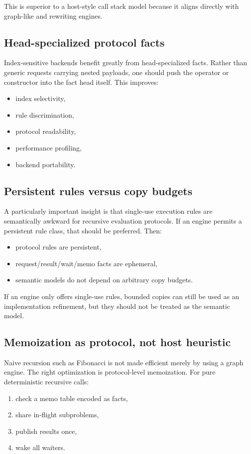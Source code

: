 \documentclass[11pt]{article}
\begin{document}
This is superior to a host-style call stack model because it aligns directly with graph-like and rewriting engines.

\subsection{Head-specialized protocol facts}

Index-sensitive backends benefit greatly from head-specialized facts. Rather than generic requests carrying nested payloads, one should push the operator or constructor into the fact head itself. This improves:
\begin{itemize}[leftmargin=2em]
  \item index selectivity,
  \item rule discrimination,
  \item protocol readability,
  \item performance profiling,
  \item backend portability.
\end{itemize}

\subsection{Persistent rules versus copy budgets}

A particularly important insight is that single-use execution rules are semantically awkward for recursive evaluation protocols. If an engine permits a persistent rule class, that should be preferred. Then:
\begin{itemize}[leftmargin=2em]
  \item protocol rules are persistent,
  \item request/result/wait/memo facts are ephemeral,
  \item semantic models do not depend on arbitrary copy budgets.
\end{itemize}

If an engine only offers single-use rules, bounded copies can still be used as an implementation refinement, but they should not be treated as the semantic model.

\subsection{Memoization as protocol, not host heuristic}

Naive recursion such as Fibonacci is not made efficient merely by using a graph engine. The right optimization is protocol-level memoization. For pure deterministic recursive calls:
\begin{enumerate}[leftmargin=2em]
  \item check a memo table encoded as facts,
  \item share in-flight subproblems,
  \item publish results once,
  \item wake all waiters.
\end{enumerate}
\end{document}
